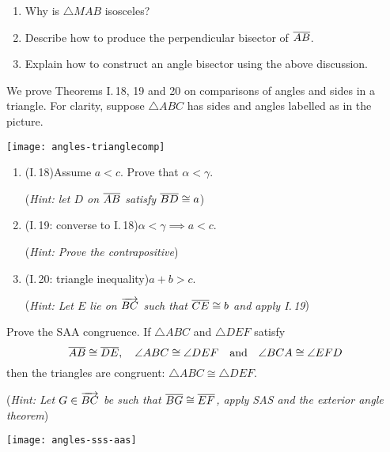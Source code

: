 \begin{exercises}
\begin{enumerate}
\begin{enumerate}
		  \item Why is $\triangle MAB$ isosceles?
		  
		  \item Describe how to produce the perpendicular bisector of $\overline{AB}$.
		  
		  \item Explain how to construct an angle bisector using the above discussion.
		\end{enumerate}
	  
	 
	  
	  \begin{minipage}[t]{0.57\linewidth}\vspace{0pt}
		  \item\label{ex:euclidi19} We prove Theorems I.\,18, 19 and 20 on comparisons of angles and sides in a triangle. For clarity, suppose $\triangle ABC$ has sides and angles labelled as in the picture.
		\end{minipage}
		\hfill
		\begin{minipage}[t]{0.42\linewidth}\vspace{0pt}
		  \flushright
		  \texttt{[image: angles-trianglecomp]}
	  \end{minipage}
	  \vspace{-55pt}
	  \begin{enumerate}
	    \item (I.\,18)\quad Assume $a<c$. Prove that $\alpha<\gamma$.\par
	    (\emph{Hint: let $D$ on $\overline{AB}$ satisfy $\overline{BD}\cong a$})
	    \item (I.\,19: converse to I.\,18)\quad $\alpha<\gamma\implies a<c$.\par
	    (\emph{Hint: Prove the contrapositive})
	    \item (I.\,20: triangle inequality)\quad $a+b>c$.\par
	    (\emph{Hint: Let $E$ lie on $\overrightarrow{BC}$ such that $\overline{CE}\cong b$ and apply I.\,19})
	  \end{enumerate}
	   
	  
	  \begin{minipage}[t]{0.68\linewidth}\vspace{0pt}
		  \item\label{exs:saaproof} Prove the SAA congruence. If $\triangle ABC$ and $\triangle DEF$ satisfy
		  \[
		  	\overline{AB}\cong\overline{DE},\quad \angle ABC\cong\angle{DEF}\quad \text{and}\quad\angle BCA\cong\angle EFD
		  \]
		  then the triangles are congruent: $\triangle ABC\cong\triangle DEF$.\par
		  (\emph{Hint: Let $G\in\overrightarrow{BC}$ be such that $\overline{BG}\cong\overline{EF}$, apply SAS and the exterior angle theorem})
	  \end{minipage}
	  \hfill
	  \begin{minipage}[t]{0.3\linewidth}\vspace{0pt}
			\flushright
			\texttt{[image: angles-sss-aas]}
		\end{minipage}
	  

\end{enumerate}
\end{exercises}

